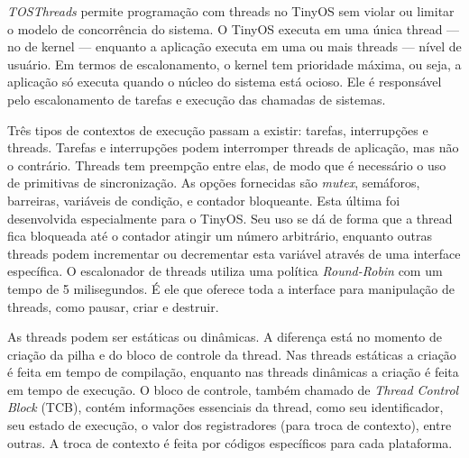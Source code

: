 \documentclass[a4paper, 10pt]{article}
\begin{document}
\textit{TOSThreads} permite programação com threads no TinyOS sem violar ou limitar o modelo de concorrência do
sistema. O TinyOS executa em uma única thread --- no de kernel --- enquanto a aplicação executa 
em uma ou mais threads --- nível de usuário.
Em termos de escalonamento, o kernel tem prioridade máxima, ou seja, a aplicação só executa quando o núcleo do sistema
está ocioso. Ele é responsável pelo escalonamento de tarefas e execução das chamadas de sistemas. 


Três tipos de contextos de execução passam a existir: tarefas, interrupções e threads. Tarefas e interrupções podem
interromper threads de aplicação, mas não o contrário. Threads tem preempção entre elas, 
de modo que é necessário o uso de primitivas de sincronização. 
As opções fornecidas são \textit{mutex}, semáforos, barreiras, variáveis de condição, e contador
bloqueante. Esta última foi desenvolvida especialmente para o TinyOS. Seu uso se dá de forma que a thread fica bloqueada
até o contador atingir um número arbitrário, enquanto outras threads podem incrementar ou decrementar esta variável
através de uma interface específica.
O escalonador de threads utiliza uma política \textit{Round-Robin} com um tempo de 5 milisegundos. É ele que oferece
toda a interface para manipulação de threads, como pausar, criar e destruir. 

As threads podem ser estáticas ou dinâmicas. A diferença está no momento de criação da pilha e do bloco de controle da
thread. Nas threads estáticas a criação é feita em tempo de compilação, enquanto nas threads dinâmicas 
a criação é feita em tempo de execução. O bloco de controle, também chamado de
\textit{Thread Control Block} (TCB), contém informações essenciais da thread, como seu identificador, seu estado de
execução, o valor dos registradores (para troca de contexto), entre outras\cite{TEP134}.
A troca de contexto é feita por códigos específicos para cada plataforma. 
\end{document}
